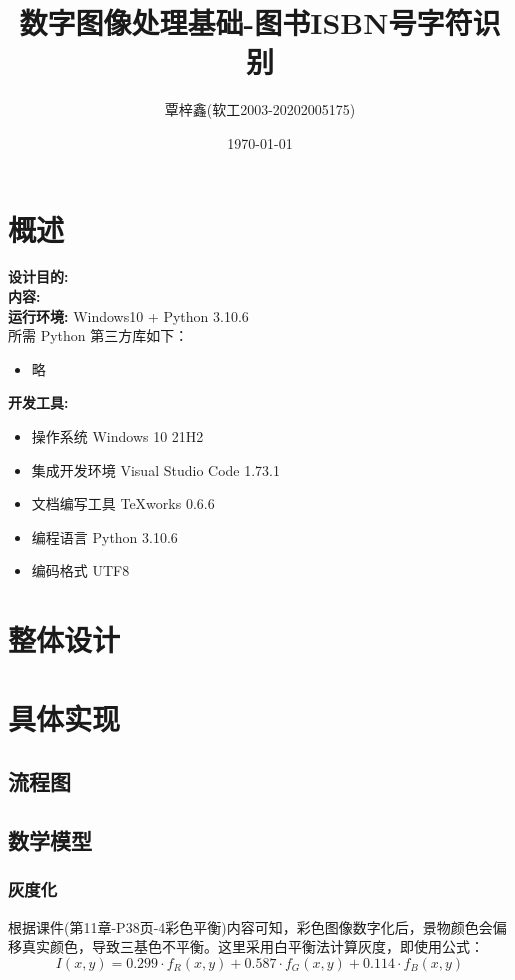 \documentclass{ctexart}
\begin{document}
\title{数字图像处理基础-图书ISBN号字符识别}
\author{覃梓鑫(软工2003-20202005175)}
\date{\today}
\maketitle
\tableofcontents
\newpage
\section{概述}
\noindent
\textbf{设计目的:}\\
\textbf{内容:}\\
\textbf{运行环境:}
Windows10 + Python 3.10.6\\
所需 Python 第三方库如下：
\begin{itemize}
    \item 略
\end{itemize}
\noindent
\textbf{开发工具:}%
\begin{itemize}
    \item 操作系统 Windows 10 21H2
    \item 集成开发环境 Visual Studio Code 1.73.1
    \item 文档编写工具 TeXworks 0.6.6
    \item 编程语言 Python 3.10.6
    \item 编码格式 UTF8
\end{itemize}

\section{整体设计}
\section{具体实现}
\subsection{流程图}
\subsection{数学模型}
\subsubsection{灰度化}
根据课件(第11章-P38页-4彩色平衡)内容可知，彩色图像数字化后，景物颜色会偏移真实颜色，导致三基色不平衡。这里采用白平衡法计算灰度，即使用公式：
\[I(x,y)=0.299\cdot f_R(x,y)+0.587\cdot f_G(x,y)+0.114\cdot f_B(x,y)\]
\end{document}
